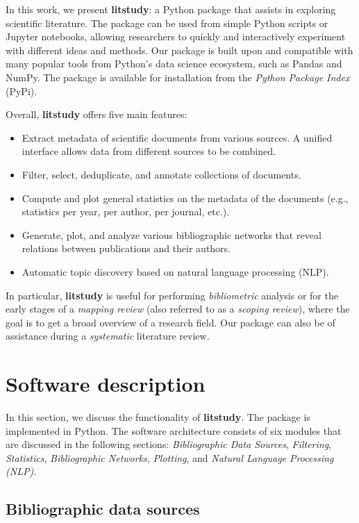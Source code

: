 \documentclass{article}
\begin{document}
In this work, we present \textbf{litstudy}: a Python package that assists in exploring scientific literature. The package can be used from simple Python scripts or Jupyter notebooks, allowing researchers to quickly and interactively experiment with different ideas and methods. Our package is built upon and compatible with many popular tools from Python's data science ecosystem, such as Pandas and NumPy. The package is available for installation from the \textit{Python Package Index} (PyPi).

Overall, \textbf{litstudy} offers five main features:

\begin{itemize}
\item Extract metadata of scientific documents from various sources. A unified interface allows data from different sources to be combined.
\item Filter, select, deduplicate, and annotate collections of documents.
\item Compute and plot general statistics on the metadata of the documents (e.g., statistics per year, per author, per journal, etc.).
\item Generate, plot, and analyze various bibliographic networks that reveal relations between publications and their authors.
\item Automatic topic discovery based on natural language processing (NLP).
\end{itemize}

In particular, \textbf{litstudy} is useful for performing \textit{bibliometric} analysis or for the early stages of a \textit{mapping review} (also referred to as a \textit{scoping review}), where the goal is to get a broad overview of a research field. Our package can also be of assistance during a \textit{systematic} literature review.

\section{Software description}

In this section, we discuss the functionality of \textbf{litstudy}. The package is implemented in Python. The software architecture consists of six modules that are discussed in the following sections: \textit{Bibliographic Data Sources}, \textit{Filtering}, \textit{Statistics}, \textit{Bibliographic Networks}, \textit{Plotting}, and \textit{Natural Language Processing (NLP)}.

\subsection{Bibliographic data sources}
\end{document}
